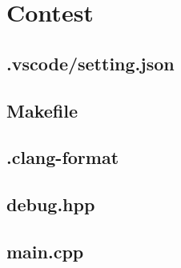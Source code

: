 \section{Contest}

\subsection{.vscode/setting.json}


\subsection{Makefile}


\subsection{.clang-format}


\subsection{debug.hpp}


\subsection{main.cpp}

